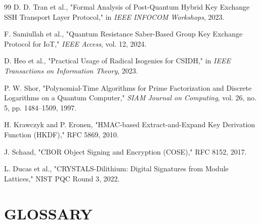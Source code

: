 \documentclass[12pt,a4paper]{report}
\begin{document}
\begin{thebibliography}{99}
D. D. Tran et al., "Formal Analysis of Post-Quantum Hybrid Key Exchange SSH Transport Layer Protocol," in \textit{IEEE INFOCOM Workshops}, 2023.

F. Samiullah et al., "Quantum Resistance Saber-Based Group Key Exchange Protocol for IoT," \textit{IEEE Access}, vol. 12, 2024.

D. Heo et al., "Practical Usage of Radical Isogenies for CSIDH," in \textit{IEEE Transactions on Information Theory}, 2023.

P. W. Shor, "Polynomial-Time Algorithms for Prime Factorization and Discrete Logarithms on a Quantum Computer," \textit{SIAM Journal on Computing}, vol. 26, no. 5, pp. 1484–1509, 1997.

H. Krawczyk and P. Eronen, "HMAC-based Extract-and-Expand Key Derivation Function (HKDF)," RFC 5869, 2010.

J. Schaad, "CBOR Object Signing and Encryption (COSE)," RFC 8152, 2017.

L. Ducas et al., "CRYSTALS-Dilithium: Digital Signatures from Module Lattices," NIST PQC Round 3, 2022.

\end{thebibliography}


\chapter*{GLOSSARY}
\end{document}
